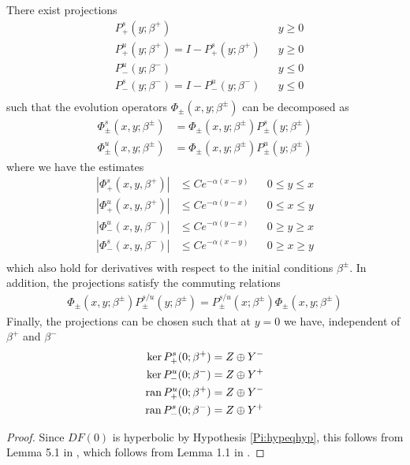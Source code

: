 \documentclass[thesis.tex]{subfiles}
\begin{document}
\begin{lemma}\label{dichotomy1}
There exist projections
\begin{align*}
&P_+^s(y; \beta^+) && y \geq 0 \\
&P_+^u(y; \beta^+) = I - P_+^s(y; \beta^+) && y \geq 0 \\
&P_-^u(y; \beta^-) && y \leq 0 \\
&P_-^s(y; \beta^-) = I - P_-^u(y; \beta^-) && y \leq 0 \\
\end{align*}
such that the evolution operators $\Phi_\pm(x, y; \beta^\pm)$ can be decomposed as
\begin{align*}
\Phi^s_\pm(x, y; \beta^\pm) &= \Phi_\pm(x, y; \beta^\pm) P^s_\pm(y; \beta^\pm) \\
\Phi^u_\pm(x, y; \beta^\pm) &= \Phi_\pm(x, y; \beta^\pm) P^u_\pm(y; \beta^\pm) 
\end{align*}
where we have the estimates
\begin{align*}
|\Phi^s_+(x, y, \beta^+)| &\leq C e^{-\alpha(x - y)} && 0 \leq y \leq x \\
|\Phi^u_+(x, y, \beta^+)| &\leq C e^{-\alpha(y - x)} && 0 \leq x \leq y \\
|\Phi^u_-(x, y, \beta^-)| &\leq C e^{-\alpha(y - x)} && 0 \geq y \geq x \\
|\Phi^s_-(x, y, \beta^-)| &\leq C e^{-\alpha(x - y)} && 0 \geq x \geq y \\
\end{align*}
which also hold for derivatives with respect to the initial conditions $\beta^\pm$. In addition, the projections satisfy the commuting relations
\begin{align*}
\Phi_\pm(x, y; \beta^\pm) P^{s/u}_\pm(y; \beta^\pm) 
= P^{s/u}_\pm(x; \beta^\pm) \Phi_\pm(x, y; \beta^\pm)
\end{align*}
Finally, the projections can be chosen such that at $y = 0$ we have, independent of $\beta^+$ and $\beta^-$
\begin{align*}
\ker P^s_+(0; \beta^+) &= Z \oplus Y^- \\
\ker P^u_-(0; \beta^-) &= Z \oplus Y^+ \\
\operatorname{ran} P^u_+(0; \beta^+) &= Z \oplus Y^- \\
\operatorname{ran} P^s_-(0; \beta^-) &= Z \oplus Y^+
\end{align*}

\begin{proof}
Since $DF(0)$ is hyperbolic by Hypothesis \ref{Pi:hypeqhyp}, this follows from Lemma 5.1 in \cite{Sandstede1997}, which follows from Lemma 1.1 in \cite{Sandstede1993}.
\end{proof}
\end{lemma}
\end{document}
